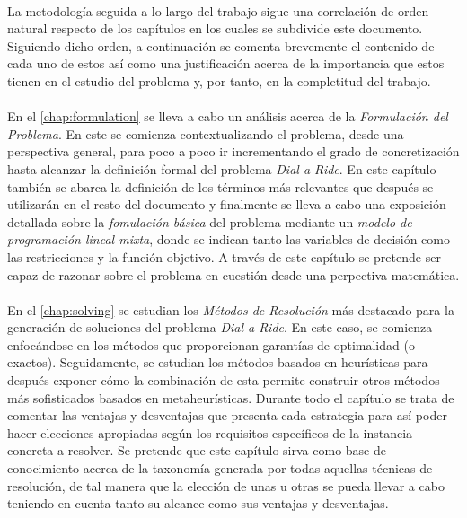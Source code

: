 \documentclass{subfiles}
\begin{document}
      \paragraph{}
      La metodología seguida a lo largo del trabajo sigue una correlación de orden natural respecto de los capítulos en los cuales se subdivide este documento. Siguiendo dicho orden, a continuación se comenta brevemente el contenido de cada uno de estos así como una justificación acerca de la importancia que estos tienen en el estudio del problema y, por tanto, en la completitud del trabajo.

      \paragraph{}
      En el \cref{chap:formulation} se lleva a cabo un análisis acerca de la \emph{Formulación del Problema}. En este se comienza contextualizando el problema, desde una perspectiva general, para poco a poco ir incrementando el grado de concretización hasta alcanzar la definición formal del problema \emph{Dial-a-Ride}. En este capítulo también se abarca la definición de los términos más relevantes que después se utilizarán en el resto del documento y finalmente se lleva a cabo una exposición detallada sobre la \emph{fomulación básica} del problema mediante un \emph{modelo de programación lineal mixta}, donde se indican tanto las variables de decisión como las restricciones y la función objetivo. A través de este capítulo se pretende ser capaz de razonar sobre el problema en cuestión desde una perpectiva matemática.

      \paragraph{}
      En el \cref{chap:solving} se estudian los \emph{Métodos de Resolución} más destacado para la generación de soluciones del problema \emph{Dial-a-Ride}. En este caso, se comienza enfocándose en los métodos que proporcionan garantías de optimalidad (o exactos). Seguidamente, se estudian los métodos basados en heurísticas para después exponer cómo la combinación de esta permite construir otros métodos más sofisticados basados en metaheurísticas. Durante todo el capítulo se trata de comentar las ventajas y desventajas que presenta cada estrategia para así poder hacer elecciones apropiadas según los requisitos específicos de la instancia concreta a resolver. Se pretende que este capítulo sirva como base de conocimiento acerca de la taxonomía generada por todas aquellas técnicas de resolución, de tal manera que la elección de unas u otras se pueda llevar a cabo teniendo en cuenta tanto su alcance como sus ventajas y desventajas.
\end{document}
